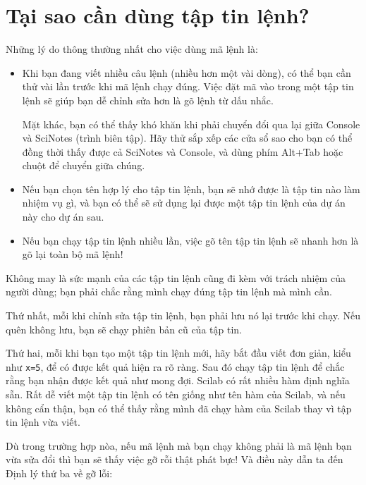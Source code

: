 \documentclass[12pt]{book}
\begin{document}
\section{Tại sao cần dùng tập tin lệnh?}

Những lý do thông thường nhất cho việc dùng mã lệnh là:

\begin{itemize}

\item Khi bạn đang viết nhiều câu lệnh (nhiều hơn một vài dòng), có thể
bạn cần thử vài lần trước khi mã lệnh chạy đúng. Việc đặt mã vào trong
một tập tin lệnh sẽ giúp bạn dễ chỉnh sửa hơn là gõ lệnh từ dấu nhắc.

Mặt khác, bạn có thể thấy khó khăn khi phải chuyển đổi qua lại giữa 
Console và SciNotes (trình biên tập). Hãy thử sắp xếp các cửa sổ
sao cho bạn có thể đồng thời thấy được cả SciNotes và Console,
và dùng phím Alt+Tab hoặc chuột để chuyển giữa chúng.

\item Nếu bạn chọn tên hợp lý cho tập tin lệnh, bạn sẽ nhớ được là
tập tin nào làm nhiệm vụ gì, và bạn có thể sẽ sử dụng lại được một
tập tin lệnh của dự án này cho dự án sau.

\item Nếu bạn chạy tập tin lệnh nhiều lần, việc gõ tên tập tin lệnh sẽ 
nhanh hơn là gõ lại toàn bộ mã lệnh!

\end{itemize}

Không may là sức mạnh của các tập tin lệnh cũng đi kèm với trách nhiệm
của người dùng; bạn phải chắc rằng mình chạy đúng tập tin lệnh mà
mình cần.

Thứ nhất, mỗi khi chỉnh sửa tập tin lệnh, bạn phải lưu nó lại trước khi 
chạy. Nếu quên không lưu, bạn sẽ chạy phiên bản cũ của tập tin.

Thứ hai, mỗi khi bạn tạo một tập tin lệnh mới, hãy bắt đầu viết 
đơn giản, kiểu như {\tt x=5}, để có được kết quả hiện ra rõ ràng. Sau đó
chạy tập tin lệnh để chắc rằng bạn nhận được kết quả như mong đợi.
Scilab có rất nhiều hàm định nghĩa sẵn. Rất dễ viết một tập tin lệnh
có tên giống như tên hàm của Scilab, và nếu không cẩn thận, bạn
có thể thấy rằng mình đã chạy hàm của Scilab thay vì tập tin lệnh
vừa viết.

Dù trong trường hợp nòa, nếu mã lệnh mà bạn chạy không phải là mã
lệnh bạn vừa sửa đổi thì bạn sẽ thấy việc gỡ rỗi thật phát bực! Và 
điều này dẫn ta đến Định lý thứ ba về gỡ lỗi:
\end{document}
